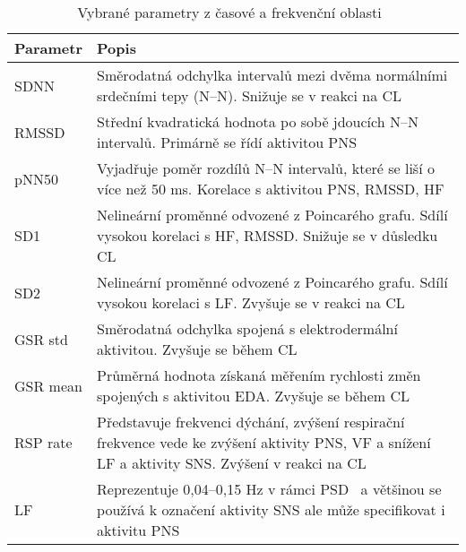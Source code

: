\begin{table}[!htb]
    \renewcommand{\arraystretch}{1.2}
    \scriptsize
    \centering
    \begin{threeparttable}
        \caption{Vybrané parametry z časové a frekvenční oblasti~\cite{Ishaque2021}}
        \label{tab:hrv_params}
        \begin{tabular}{p{2cm}p{12cm}}
            \toprule
            Parametr & Popis                                                                                                                                                        \\ \midrule
            SDNN     & Směrodatná odchylka intervalů mezi dvěma normálními srdečními tepy (N--N). Snižuje se v reakci na \gls{CL}                              \\
            RMSSD    & Střední kvadratická hodnota po sobě jdoucích N--N intervalů. Primárně se řídí aktivitou \gls{PNS}                                    \\
            pNN50    & Vyjadřuje poměr rozdílů N--N intervalů, které se liší o více než 50 ms. Korelace s aktivitou \gls{PNS}, RMSSD, HF                              \\
            SD1      & Nelineární proměnné odvozené z Poincarého grafu. Sdílí vysokou korelaci s HF, RMSSD. Snižuje se v důsledku \gls{CL}                                          \\
            SD2      & Nelineární proměnné odvozené z Poincarého grafu. Sdílí vysokou korelaci s LF. Zvyšuje se v reakci na \gls{CL}                                                \\
            GSR std  & Směrodatná odchylka spojená s elektrodermální aktivitou. Zvyšuje se během \gls{CL}                                                                           \\
            GSR mean & Průměrná hodnota získaná měřením rychlosti změn spojených s aktivitou EDA. Zvyšuje se během \gls{CL}                                                         \\
            RSP rate & Představuje frekvenci dýchání, zvýšení respirační frekvence vede ke zvýšení aktivity \gls{PNS}, VF a snížení LF a aktivity SNS. Zvýšení v reakci na \gls{CL} \\
            LF       & Reprezentuje 0,04--0,15 Hz v rámci PSD\tnote{1} ~a většinou se používá k označení aktivity \gls{SNS} ale může specifikovat i aktivitu \gls{PNS}              \\

\end{tabular}
\end{threeparttable}
\end{table}
